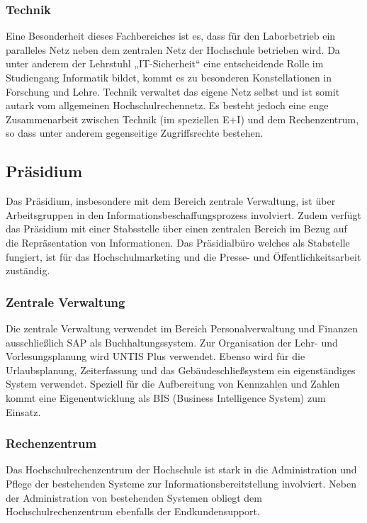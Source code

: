 \subsubsection{Technik}
Eine Besonderheit dieses Fachbereiches ist es, dass für den Laborbetrieb ein paralleles Netz neben dem zentralen Netz der Hochschule betrieben wird. Da unter anderem der Lehrstuhl „IT-Sicherheit“ eine entscheidende Rolle im Studiengang Informatik bildet, kommt es zu besonderen Konstellationen in Forschung und Lehre. Technik verwaltet das eigene Netz selbst und ist somit autark vom allgemeinen Hochschulrechennetz. Es besteht jedoch eine enge Zusammenarbeit zwischen Technik (im speziellen E+I) und dem Rechenzentrum, so dass unter anderem gegenseitige Zugriffsrechte bestehen. 

\subsection{Präsidium}
\label{praesidium_label}

Das Präsidium, insbesondere mit dem Bereich zentrale Verwaltung, ist über  Arbeitsgruppen in den Informationsbeschaffungsprozess involviert. Zudem verfügt das Präsidium mit einer Stabsstelle über einen zentralen Bereich im Bezug auf die Repräsentation von Informationen. Das Präsidialbüro welches als Stabstelle fungiert, ist für das Hochschulmarketing und die Presse- und Öffentlichkeitsarbeit zuständig. 

\subsubsection{Zentrale Verwaltung}
Die zentrale Verwaltung verwendet im Bereich Personalverwaltung und Finanzen ausschließlich SAP als Buchhaltungssystem. Zur Organisation der Lehr- und Vorlesungsplanung wird UNTIS Plus verwendet. Ebenso wird für die Urlaubsplanung, Zeiterfassung und das Gebäudeschließsystem ein eigenständiges System verwendet. Speziell für die Aufbereitung von Kennzahlen und Zahlen kommt eine Eigenentwicklung als BIS (Business Intelligence System) zum Einsatz. 

\subsubsection{Rechenzentrum}
Das Hochschulrechenzentrum der Hochschule ist stark in die Administration und Pflege der bestehenden Systeme zur Informationsbereitstellung involviert. Neben der Administration von bestehenden Systemen obliegt dem Hochschulrechenzentrum ebenfalls der Endkundensupport.

